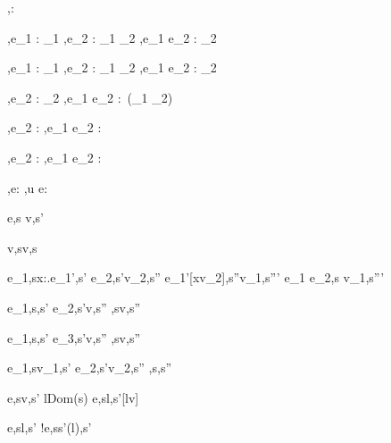   {}
  {\Gamma,\Sigma \infers \Fail : \Task \tau}


  {\Gamma,\Sigma \infers e_1 : \Task \tau_1 \Quad
   \Gamma,\Sigma \infers e_2 : \tau_1 \to \Task \tau_2}
  {\Gamma,\Sigma \infers e_1 \Then e_2 : \Task \tau_2}


  {\Gamma,\Sigma \infers e_1 : \Task \tau_1 \Quad
   \Gamma,\Sigma \infers e_2 : \tau_1 \to \Task \tau_2}
  {\Gamma,\Sigma \infers e_1 \Next e_2 : \Task \tau_2}


  {
   {\Gamma,\Sigma \infers e_2 : \Task \tau_2}}
  {\Gamma,\Sigma \infers e_1 \And e_2 : \Task\,(\tau_1 \times \tau_2)}


  {
   {\Gamma,\Sigma \infers e_2 : \Task \tau}}
  {\Gamma,\Sigma \infers e_1 \Or e_2 : \Task \tau}


  {
   {\Gamma,\Sigma \infers e_2 : \Task \tau}}
  {\Gamma,\Sigma \infers e_1 \Xor e_2 : \Task \tau}


  {\Gamma,\Sigma\infers e:\Task\tau}
  {\Gamma,\Sigma\infers u \At e:\Task\tau}





  {e,s \evaluate v,s'}


  {}
  {v,s\evaluate v,s}


  {e_1,s\evaluate \lambda x:\tau.e_1',s' \Quad
   e_2,s'\evaluate v_2,s'' \Quad
   e_1'[x\mapsto v_2],s''\evaluate v_1,s'''}
  {e_1 e_2,s \evaluate v_1,s'''}


  {e_1,s\evaluate \True,s' \Quad
   e_2,s'\evaluate v,s''}
  {,s\evaluate v,s''}

  {e_1,s\evaluate \False,s' \Quad
   e_3,s'\evaluate v,s''}
  {,s\evaluate v,s''}


  {e_1,s\evaluate v_1,s' \Quad
   e_2,s'\evaluate v_2,s''}
  {,s\evaluate{},s''}


  {e,s\evaluate v,s' \Quad
   l\not\in Dom(s)}
  {\Ref e,s\evaluate l,s'[l\mapsto v]}

  {e,s\evaluate l,s'}
  {!e,s\evaluate s'(l),s'}

